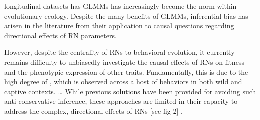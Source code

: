\documentclass{article}
\begin{document}
longitudinal datasets has GLMMs has increasingly become the norm within
evolutionary ecology. Despite the many benefits of GLMMs, inferential
bias has arisen in the literature from their application to causal
questions regarding directional effects of RN parameters.

However, despite the centrality of RNs to behavioral evolution, it
currently remains difficulty to unbiasedly investigate the causal
effects of RNs on fitness and the phenotypic expression of other traits.
Fundamentally, this is due to the high degree of , which is observed
across a host of behaviors in both wild and captive contexts. \ldots{}
While previous solutions have been provided for avoiding such
anti-conservative inference, these approaches are limited in their
capacity to address the complex, directional effects of RNs {[}see fig
2{]} .
\end{document}
